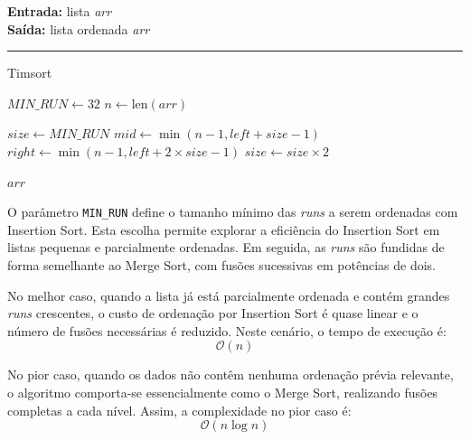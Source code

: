 \documentclass[conference]{IEEEtran}
\begin{document}
\begin{algorithm}[H]
    \raggedright
    \vspace{.1em}
    \textbf{Entrada:} lista \textit{arr} \\
    \textbf{Saída:} lista ordenada \textit{arr} \\
    \vspace{.5em}
    \hrule 
    \caption{Timsort}
    \begin{algorithmic}[1]
            \State $MIN\_RUN \gets 32$
            \State $n \gets \text{len}(arr)$
    
                \State {}
            \EndFor
    
            \State $size \gets MIN\_RUN$
                    \State $mid \gets \min(n - 1, left + size - 1)$
                    \State $right \gets \min(n - 1, left + 2 \times size - 1)$
                        \State {}
                    \EndIf
                \EndFor
                \State $size \gets size \times 2$
            \EndWhile
    
            \State \Return $arr$
        \EndFunction
    
        \State {}
    \end{algorithmic}
\end{algorithm}

O parâmetro \texttt{MIN\_RUN} define o tamanho mínimo das \textit{runs} a serem ordenadas com Insertion Sort. Esta escolha permite explorar a eficiência do Insertion Sort em listas pequenas e parcialmente ordenadas. Em seguida, as \textit{runs} são fundidas de forma semelhante ao Merge Sort, com fusões sucessivas em potências de dois.

No melhor caso, quando a lista já está parcialmente ordenada e contém grandes \textit{runs} crescentes, o custo de ordenação por Insertion Sort é quase linear e o número de fusões necessárias é reduzido. Neste cenário, o tempo de execução é:
\[
\mathcal{O}(n)
\]

No pior caso, quando os dados não contêm nenhuma ordenação prévia relevante, o algoritmo comporta-se essencialmente como o Merge Sort, realizando fusões completas a cada nível. Assim, a complexidade no pior caso é:
\[
\mathcal{O}(n \log n)
\]
\end{document}
